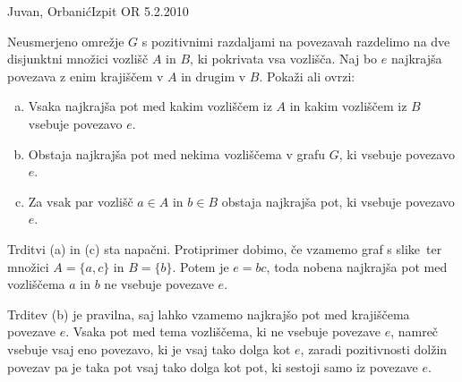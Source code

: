 \begin{naloga}{Juvan, Orbanić}{Izpit OR 5.2.2010}
\begin{vprasanje}
Neusmerjeno omrežje $G$ s pozitivnimi razdaljami na povezavah
razdelimo na dve disjunktni množici vozlišč $A$ in $B$,
ki pokrivata vsa vozlišča.
Naj bo $e$ najkrajša povezava z enim krajiščem v $A$ in drugim v $B$.
Pokaži ali ovrzi:
\begin{enumerate}[(a)]
\item Vsaka najkrajša pot med kakim vozliščem iz $A$
in kakim vozliščem iz $B$ vsebuje povezavo $e$.
\item Obstaja najkrajša pot med nekima vozliščema v grafu $G$,
ki vsebuje povezavo $e$.
\item Za vsak par vozlišč $a \in A$ in $b \in B$ obstaja najkrajša pot,
ki vsebuje povezavo $e$.
\end{enumerate}
\end{vprasanje}

\begin{odgovor}
Trditvi (a) in (c) sta napačni.
Protiprimer dobimo,
če vzamemo graf s slike~\fig[trditve]
ter množici $A = \{a, c\}$ in $B = \{b\}$.
Potem je $e = bc$,
toda nobena najkrajša pot med vozliščema $a$ in $b$
ne vsebuje povezave $e$.

Trditev (b) je pravilna,
saj lahko vzamemo najkrajšo pot med krajiščema povezave $e$.
Vsaka pot med tema vozliščema, ki ne vsebuje povezave $e$,
namreč vsebuje vsaj eno povezavo, ki je vsaj tako dolga kot $e$,
zaradi pozitivnosti dolžin povezav pa je taka pot
vsaj tako dolga kot pot,
ki sestoji samo iz povezave $e$.
\end{odgovor}
\end{naloga}
